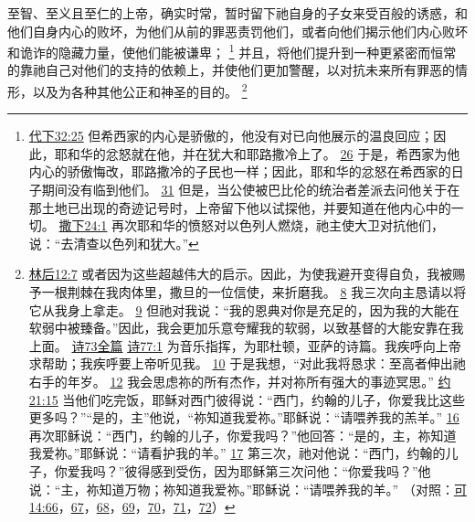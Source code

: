 \documentclass[12pt, a4paper, oneside]{ctexart}
\newcounter{parnum}[section]
\newcommand{\N}{%
   \noindent\refstepcounter{parnum}%
    \makebox[\parindent][l]{\textbf{\arabic{parnum}.}}}
\begin{document}
\N 至智、至义且至仁的上帝，确实时常，暂时留下祂自身的子女来受百般的诱惑，和他们自身内心的败坏，为他们从前的罪恶责罚他们，或者向他们揭示他们内心败坏和诡诈的隐藏力量，使他们能被谦卑；
	\footnote {
		\href{https://biblehub.com/2_chronicles/32-25.htm}{代下32:25} 但希西家的内心是骄傲的，他没有对已向他展示的温良回应；因此，耶和华的忿怒就在他，并在犹大和耶路撒冷上了。
		\href{https://biblehub.com/2_chronicles/32-26.htm}{26} 于是，希西家为他内心的骄傲悔改，耶路撒冷的子民也一样；因此，耶和华的忿怒在希西家的日子期间没有临到他们。
		\href{https://biblehub.com/2_chronicles/32-31.htm}{31} 但是，当公使被巴比伦的统治者差派去问他关于在那土地已出现的奇迹记号时，上帝留下他以试探他，并要知道在他内心中的一切。
		\href{https://biblehub.com/2_samuel/24-1.htm}{撒下24:1} 再次耶和华的愤怒对以色列人燃烧，祂主使大卫对抗他们，说：“去清查以色列和犹大。”
	}
	并且，将他们提升到一种更紧密而恒常的靠祂自己对他们的支持的依赖上，并使他们更加警醒，以对抗未来所有罪恶的情形，以及为各种其他公正和神圣的目的。
	\footnote {
		\href{https://biblehub.com/2_corinthians/12-7.htm}{林后12:7} 或者因为这些超越伟大的启示。因此，为使我避开变得自负，我被赐予一根荆棘在我肉体里，撒旦的一位信使，来折磨我。
		\href{https://biblehub.com/2_corinthians/12-8.htm}{8} 我三次向主恳请以将它从我身上拿走。
		\href{https://biblehub.com/2_corinthians/12-9.htm}{9} 但祂对我说：“我的恩典对你是充足的，因为我的大能在软弱中被臻备。”因此，我会更加乐意夸耀我的软弱，以致基督的大能安靠在我上面。
		\href{https://biblehub.com/niv/psalms/73.htm}{诗73全篇}
		\href{https://biblehub.com/psalms/77-1.htm}{诗77:1} 为音乐指挥，为耶杜顿，亚萨的诗篇。我疾呼向上帝求帮助；我疾呼要上帝听见我。
		\href{https://biblehub.com/psalms/77-10.htm}{10} 于是我想，“对此我将恳求：至高者伸出祂右手的年岁。
		\href{https://biblehub.com/psalms/77-12.htm}{12} 我会思虑祢的所有杰作，并对祢所有强大的事迹冥思。”
		\href{https://biblehub.com/john/21-15.htm}{约21:15} 当他们吃完饭，耶稣对西门彼得说：“西门，约翰的儿子，你爱我比这些更多吗？”“是的，主”他说，“祢知道我爱祢。”耶稣说：“请喂养我的羔羊。”
		\href{https://biblehub.com/john/21-16.htm}{16} 再次耶稣说：“西门，约翰的儿子，你爱我吗？”他回答：“是的，主，祢知道我爱祢。”耶稣说：“请看护我的羊。”
		\href{https://biblehub.com/john/21-17.htm}{17} 第三次，祂对他说：“西门，约翰的儿子，你爱我吗？”彼得感到受伤，因为耶稣第三次问他：“你爱我吗？”他说：“主，祢知道万物；祢知道我爱祢。”耶稣说：“请喂养我的羊。”
		 （对照：\href{https://biblehub.com/mark/14-66.htm}{可14:66}，\href{https://biblehub.com/mark/14-67.htm}{67}，\href{https://biblehub.com/mark/14-68.htm}{68}，\href{https://biblehub.com/mark/14-69.htm}{69}，\href{https://biblehub.com/mark/14-70.htm}{70}，\href{https://biblehub.com/mark/14-71.htm}{71}，\href{https://biblehub.com/mark/14-72.htm}{72}）
	}
\end{document}

